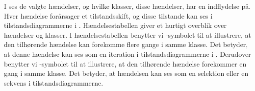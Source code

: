 I  ses de valgte hændelser, og hvilke klasser, disse hændelser, har en indflydelse på. Hver hændelse forårsager et tilstandsskift, og disse tilstande kan ses i tilstandsdiagrammerne i . Hændelsestabellen giver et hurtigt overblik over hændelser og klasser. I hændelsestabellen benytter vi \iter-symbolet til at illustrere, at den tilhørende hændelse kan forekomme flere gange i samme klasse. Det betyder, at denne hændelse kan ses som en iteration i tilstandsdiagrammerne i . Derudover benytter vi \once-symbolet til at illustrere, at den tilhørende hændelse forekommer en gang i samme klasse. Det betyder, at hændelsen kan ses som en selektion eller en sekvens i tilstandsdiagrammerne.



